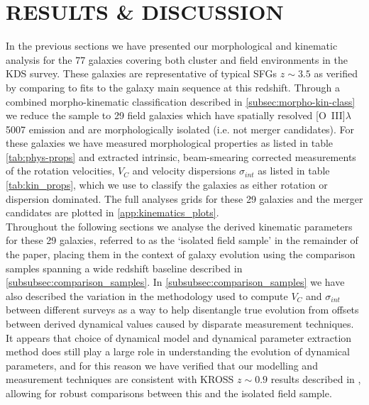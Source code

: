 \documentclass[fleqn,usenatbib]{mn2e}
\begin{document}
\section{RESULTS \& DISCUSSION}\label{sec:results}

In the previous sections we have presented our morphological and kinematic analysis for the 77 galaxies covering both cluster and field environments in the KDS survey.
These galaxies are representative of typical SFGs $z\sim3.5$ as verified by comparing to fits to the galaxy main sequence at this redshift.
Through a combined morpho-kinematic classification described in \cref{subsec:morpho-kin-class} we reduce the sample to 29 field galaxies which have spatially resolved [O~{\sc III}]$\lambda$5007 emission and are morphologically isolated (i.e. not merger candidates).
For these galaxies we have measured morphological properties as listed in table \ref{tab:phys-props} and extracted intrinsic, beam-smearing corrected measurements of the rotation velocities, $V_{C}$ and velocity dispersions $\sigma_{int}$ as listed in table \ref{tab:kin_props}, which we use to classify the galaxies as either rotation or dispersion dominated.
The full analyses grids for these 29 galaxies and the merger candidates are plotted in \cref{app:kinematics_plots}. \\

Throughout the following sections we analyse the derived kinematic parameters for these 29 galaxies, referred to as the `isolated field sample' in the remainder of the paper, placing them in the context of galaxy evolution using the comparison samples spanning a wide redshift baseline described in \cref{subsubsec:comparison_samples}.
In \cref{subsubsec:comparison_samples} we have also described the variation in the methodology used to compute $V_{C}$ and $\sigma_{int}$ between different surveys as a way to help disentangle true evolution from offsets between derived dynamical values caused by disparate measurement techniques.
It appears that choice of dynamical model and dynamical parameter extraction method does still play a large role in understanding the evolution of dynamical parameters, and for this reason we have verified that our modelling and measurement techniques are consistent with KROSS $z\sim0.9$ results described in \cite{Harrison2017}, allowing for robust comparisons between this and the isolated field sample. 
\end{document}

